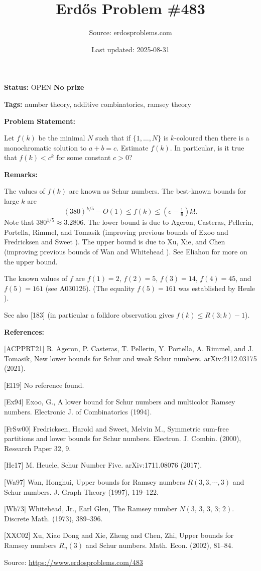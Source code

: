 \documentclass{article}
\title{Erd\H{o}s Problem \#483}
\date{Last updated: 2025-08-31}
\author{Source: erdosproblems.com}
\begin{document}
\maketitle

\noindent\textbf{Status:} OPEN \quad \textbf{No prize}

\noindent\textbf{Tags:} number theory, additive combinatorics, ramsey theory

\medskip
\noindent\textbf{Problem Statement:}

Let $f(k)$ be the minimal $N$ such that if $\{1,\ldots,N\}$ is $k$-coloured then there is a monochromatic solution to $a+b=c$. Estimate $f(k)$. In particular, is it true that $f(k) < c^k$ for some constant $c>0$?

\bigskip
\noindent\textbf{Remarks:}

The values of $f(k)$ are known as Schur numbers. The best-known bounds for large $k$ are\[(380)^{k/5}-O(1)\leq f(k) \leq (e-\tfrac{1}{6}) k!.\]Note that $380^{1/5}\approx 3.2806$. The lower bound is due to Ageron, Casteras, Pellerin, Portella, Rimmel, and Tomasik \cite{ACPPRT21} (improving previous bounds of Exoo \cite{Ex94} and Fredricksen and Sweet \cite{FrSw00}). The upper bound is due to Xu, Xie, and Chen \cite{XXC02} (improving previous bounds of Wan \cite{Wa97} and Whitehead \cite{Wh73}). See Eliahou \cite{El19} for more on the upper bound.

The known values of $f$ are $f(1)=2$, $f(2)=5$, $f(3)=14$, $f(4)=45$, and $f(5)=161$ (see A030126). (The equality $f(5)=161$ was established by Heule \cite{He17}).

See also [183] (in particular a folklore observation gives $f(k)\leq R(3;k)-1$).

\bigskip
\noindent\textbf{References:}

[ACPPRT21] R. Ageron, P. Casteras, T. Pellerin, Y. Portella, A. Rimmel, and J. Tomasik, New lower bounds for Schur and weak Schur numbers. arXiv:2112.03175 (2021).
 
 [El19] No reference found.

 [Ex94] Exoo, G., A lower bound for Schur numbers and multicolor Ramsey numbers. Electronic J. of Combinatorics (1994).
 
 [FrSw00] Fredricksen, Harold and Sweet, Melvin M., Symmetric sum-free partitions and lower bounds for Schur
numbers. Electron. J. Combin. (2000), Research Paper 32, 9.
 
 [He17] M. Heuele, Schur Number Five. arXiv:1711.08076 (2017).
 
 [Wa97] Wan, Honghui, Upper bounds for {R}amsey numbers {$R(3,3,\cdots,3)$} and
Schur numbers. J. Graph Theory (1997), 119--122.
 
 [Wh73] Whitehead, Jr., Earl Glen, The {R}amsey number {$N(3,\,3,\,3,\,3;\,2)$}. Discrete Math. (1973), 389--396.
 
 [XXC02] Xu, Xiao Dong and Xie, Zheng and Chen, Zhi, Upper bounds for {R}amsey numbers {$R_n(3)$} and Schur
numbers. Math. Econ. (2002), 81--84.

\bigskip
\noindent\small{Source: \url{https://www.erdosproblems.com/483}}
\end{document}
